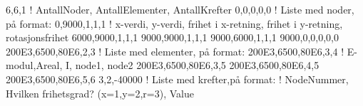 




		6,6,1                   ! AntallNoder, AntallElementer, AntallKrefter
		0,0,0,0,0		! Liste med noder, på format:
		0,9000,1,1,1            ! x-verdi, y-verdi, frihet i x-retning, frihet i y-retning, rotasjonsfrihet
		6000,9000,1,1,1
		9000,9000,1,1,1
		9000,6000,1,1,1
		9000,0,0,0,0,0  
		200E3,6500,80E6,2,3     ! Liste med elementer, på format:
		200E3,6500,80E6,3,4     ! E-modul,Areal, I, node1, node2
		200E3,6500,80E6,3,5
		200E3,6500,80E6,4,5
		200E3,6500,80E6,5,6
		3,2,-40000		! Liste med krefter,på format:
					! NodeNummer, Hvilken frihetsgrad? (x=1,y=2,r=3), Value 





